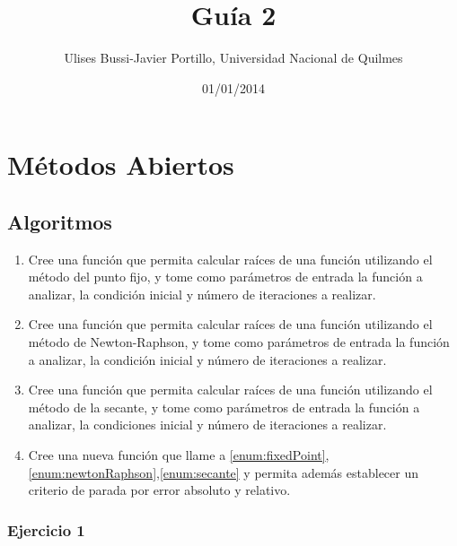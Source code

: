 \documentclass[a4paper,11pt]{article}
\makeatletter
\theoremstyle{mytheor}
\renewcommand{\maketitle}{
\colorbox{gray!20}{\framebox[\linewidth]{ \huge \textsc{\@title} } 
\lfoot{\@title}
}

}
\makeatother
\begin{document}
\title{Guía 2}

\author{Ulises Bussi-Javier Portillo, Universidad Nacional de Quilmes}

\date{01/01/2014}

\maketitle \vspace{20pt}

\section*{Métodos Abiertos}
%

\subsection*{Algoritmos}

\begin{enumerate}[label=\Roman*]

\item \label{enum:fixedPoint} Cree una función que permita calcular raíces de una función utilizando el método del punto fijo, y tome como parámetros de entrada la función a analizar, la condición inicial y número de iteraciones a realizar.

\item \label{enum:newtonRaphson} Cree una función que permita calcular raíces de una función utilizando el método de Newton-Raphson, y tome como parámetros de entrada la función a analizar, la condición inicial y número de iteraciones a realizar.

\item \label{enum:secante} Cree una función que permita calcular raíces de una función utilizando el método de la secante, y tome como parámetros de entrada la función a analizar, la condiciones inicial y número de iteraciones a realizar.


\item \label{enum:errStop} Cree una nueva función que llame a \ref{enum:fixedPoint},\ref{enum:newtonRaphson},\ref{enum:secante} y permita además establecer un criterio de parada por error absoluto y relativo.


\end{enumerate}
\subsubsection*{Ejercicio 1}
\end{document}
